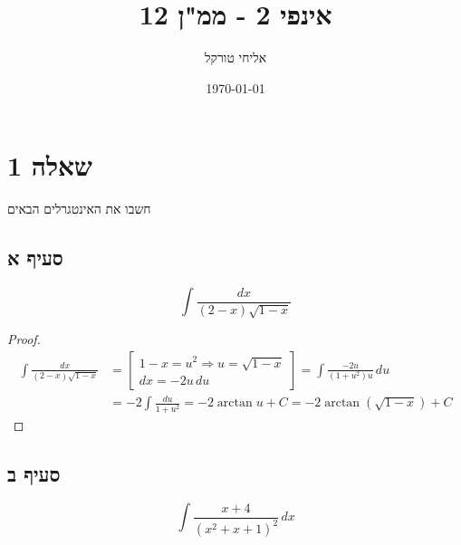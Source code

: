 \documentclass{article}
\title{אינפי 2 - ממ"ן 12}
\author{אליחי טורקל \ID}
\date\today
\begin{document}
	\maketitle %


	\section*{שאלה 1}
	חשבו את האינטגרלים הבאים

	\subsection*{סעיף א}
	\[
		\int \frac{dx}{(2-x)\sqrt{1-x}}
	\]

	\begin{proof}
		\begin{align*}
			\int \frac{dx}{(2-x)\sqrt{1-x}} &=
			\begin{bmatrix}
				1 - x = u^2 \Rightarrow u = \sqrt{1-x} \\
				dx = -2u \, du
			\end{bmatrix}
			= \int \frac{-2u}{(1+u^2)u} \, du \\
			&= -2 \int \frac{du}{1+u^2} = -2\arctan u + C
			= -2\arctan(\sqrt{1-x}) + C
		\end{align*}
	\end{proof}

	\subsection*{סעיף ב}
	\[
		\int \frac{x+4}{(x^2 + x + 1)^2} \, dx
	\]
\end{document}
